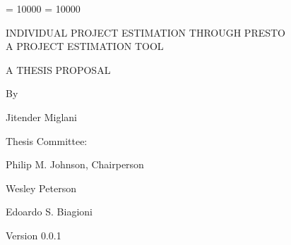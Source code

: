 
\clubpenalty = 10000    
\widowpenalty = 10000
\sloppy
\thispagestyle{empty}

\par\vspace*{0.00in}

\begin{center}
  INDIVIDUAL PROJECT ESTIMATION THROUGH PRESTO\\
  A PROJECT ESTIMATION TOOL\\

\end{center}

\vspace*{0.6in}

  \begin{center}  
  A THESIS PROPOSAL\\
  
\end{center}

\begin{center}

\vspace*{0.7in}
 
  By   
  
  \vspace{.2in}
  
  Jitender Miglani

  \vspace{0.2in}
\end{center}  

\begin{center}
  Thesis Committee:
  \vspace{0.2in}

  Philip M. Johnson, Chairperson

  Wesley Peterson

  Edoardo S. Biagioni

\end{center}

\vspace*{1in}
\begin{center}
  Version 0.0.1
\end{center}

